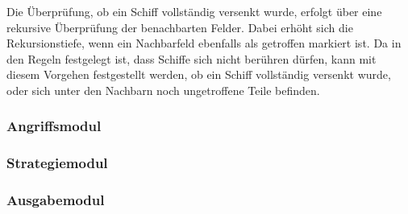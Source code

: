 	Die Überprüfung, ob ein Schiff vollständig versenkt wurde, erfolgt über eine rekursive Überprüfung der benachbarten Felder.
	Dabei erhöht sich die Rekursionstiefe, wenn ein Nachbarfeld ebenfalls als getroffen markiert ist. 
	Da in den Regeln festgelegt ist, dass Schiffe sich nicht berühren dürfen, kann mit diesem Vorgehen festgestellt werden, ob ein Schiff
	vollständig versenkt wurde, oder sich unter den Nachbarn noch ungetroffene Teile befinden.
	
	
	
\subsubsection{Angriffsmodul} \label{sec:attackModule}


\subsubsection{Strategiemodul} \label{sec:strategy}


\subsubsection{Ausgabemodul}



